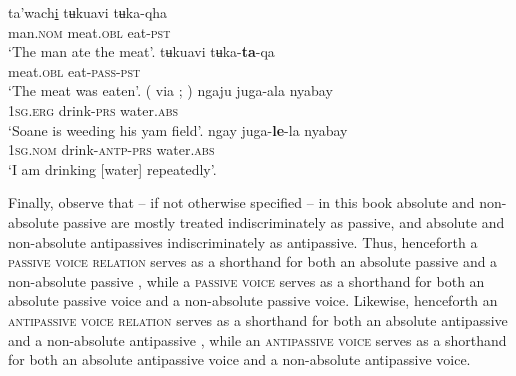 \ea {} \citep[249f.]{givon:2011}
	\ea\label{ex:Ute:eat:a}
	\gll	ta'wach\underline{i}	tʉkuavi				tʉka-qha 			\\
			man.\textsc{nom} 		meat.\textsc{obl} 	eat-\textsc{pst} 	\\
	\glt	‘The man ate the meat’.
	\ex\label{ex:Ute:eat:b}
	\gll	tʉkuavi				tʉka-\textbf{ta}-qa 				\\
			meat.\textsc{obl}	eat-\textsc{pass-pst}	\\
	\glt	‘The meat was eaten’.
	\z 
\z
\ea {} (\citealt[38]{austin:1982} via \citealt[201]{kittila:2002}; \citeyear[347]{kittila:2015})
	\ea\label{ex:Bandjalang:drink:a}
	\gll	ngaju				juga-ala			nyabay				\\
			\textsc{1sg.erg} 	drink-\textsc{prs} 	water.\textsc{abs}	\\
	\glt	‘Soane is weeding his yam field’.
	\ex\label{ex:Bandjalang:drink:b}
	\gll	ngay				juga-\textbf{le}-la			{\ob}nyabay{\cb}		\\
			\textsc{1sg.nom}	drink-\textsc{antp-prs}		{\db}water.\textsc{abs}	\\
	\glt	‘I am drinking [water] repeatedly’.
	\z
\z

\newpage
Finally, observe that -- if not otherwise specified -- in this book absolute and non-absolute passive are mostly treated indiscriminately as passive, and absolute and non-absolute antipassives indiscriminately as antipassive. Thus, henceforth a \textsc{passive voice relation} serves as a shorthand for both an absolute passive  and a non-absolute passive , while a \textsc{passive voice} serves as a shorthand for both an absolute passive voice and a non-absolute passive voice. Likewise, henceforth an \textsc{antipassive voice relation} serves as a shorthand for both an absolute antipassive  and a non-absolute antipassive , while an \textsc{antipassive voice} serves as a shorthand for both an absolute antipassive voice and a non-absolute antipassive voice.

